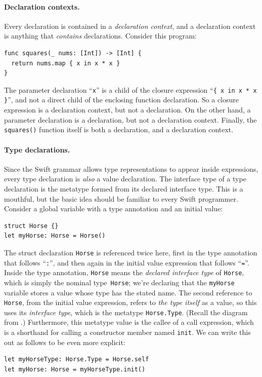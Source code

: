 \documentclass[../generics]{subfiles}
\begin{document}
\paragraph{Declaration contexts.} Every declaration is contained in a \emph{declaration context}, and a declaration context is anything that \emph{contains} declarations. Consider this program:
\begin{Verbatim}
func squares(_ nums: [Int]) -> [Int] {
  return nums.map { x in x * x }
}
\end{Verbatim}
The parameter declaration ``\texttt{x}'' is a child of the closure expression ``\verb|{ x in x * x }|'', and not a direct child of the enclosing function declaration. So a closure expression is a declaration context, but not a declaration. On the other hand, a parameter declaration is a declaration, but not a declaration context. Finally, the \texttt{squares()} function itself is both a declaration, and a declaration context.

\paragraph{Type declarations.} Since the Swift grammar allows type representations to appear inside expressions, every type declaration is \emph{also} a value declaration. The interface type of a type declaration is the metatype formed from its declared interface type. This is a mouthful, but the basic idea should be familiar to every Swift programmer. Consider a global variable with a type annotation and an initial value:
\begin{Verbatim}
struct Horse {}
let myHorse: Horse = Horse()
\end{Verbatim}
The struct declaration \texttt{Horse} is referenced twice here, first in the type annotation that follows ``\texttt{:}'', and then again in the initial value expression that follows ``\texttt{=}''. Inside the type annotation, \texttt{Horse} means the \emph{declared interface type} of \texttt{Horse}, which is simply the nominal type~\texttt{Horse}; we're declaring that the \texttt{myHorse} variable stores a value whose type has the stated name. The second reference to \texttt{Horse}, from the initial value expression, refers to \emph{the type itself} as a value, so this uses its \emph{interface type}, which is the metatype \texttt{Horse.Type}. (Recall the diagram from .) Furthermore, this metatype value is the callee of a call expression, which is a shorthand for calling a constructor member named \texttt{init}. We can write this out as follows to be even more explicit:
\begin{Verbatim}
let myHorseType: Horse.Type = Horse.self
let myHorse: Horse = myHorseType.init()
\end{Verbatim}
\end{document}
